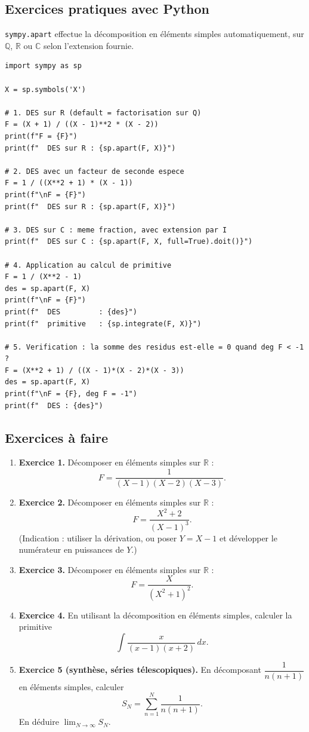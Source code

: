 \subsection{Exercices pratiques avec Python}
\texttt{sympy.apart} effectue la décomposition en éléments simples automatiquement, sur $\mathbb{Q}$, $\mathbb{R}$ ou $\mathbb{C}$ selon l'extension fournie.

\begin{lstlisting}
import sympy as sp

X = sp.symbols('X')

# 1. DES sur R (default = factorisation sur Q)
F = (X + 1) / ((X - 1)**2 * (X - 2))
print(f"F = {F}")
print(f"  DES sur R : {sp.apart(F, X)}")

# 2. DES avec un facteur de seconde espece
F = 1 / ((X**2 + 1) * (X - 1))
print(f"\nF = {F}")
print(f"  DES sur R : {sp.apart(F, X)}")

# 3. DES sur C : meme fraction, avec extension par I
print(f"  DES sur C : {sp.apart(F, X, full=True).doit()}")

# 4. Application au calcul de primitive
F = 1 / (X**2 - 1)
des = sp.apart(F, X)
print(f"\nF = {F}")
print(f"  DES         : {des}")
print(f"  primitive   : {sp.integrate(F, X)}")

# 5. Verification : la somme des residus est-elle = 0 quand deg F < -1 ?
F = (X**2 + 1) / ((X - 1)*(X - 2)*(X - 3))
des = sp.apart(F, X)
print(f"\nF = {F}, deg F = -1")
print(f"  DES : {des}")
\end{lstlisting}

\subsection{Exercices à faire}
\begin{enumerate}
    \item \textbf{Exercice 1.} Décomposer en éléments simples sur $\mathbb{R}$ :
    \[ F = \frac{1}{(X - 1)(X - 2)(X - 3)}. \]
    \item \textbf{Exercice 2.} Décomposer en éléments simples sur $\mathbb{R}$ :
    \[ F = \frac{X^2 + 2}{(X - 1)^3}. \]
    (Indication : utiliser la dérivation, ou poser $Y = X - 1$ et développer le numérateur en puissances de $Y$.)
    \item \textbf{Exercice 3.} Décomposer en éléments simples sur $\mathbb{R}$ :
    \[ F = \frac{X}{(X^2 + 1)^2}. \]
    \item \textbf{Exercice 4.} En utilisant la décomposition en éléments simples, calculer la primitive
    \[ \int \frac{x}{(x - 1)(x + 2)}\, dx. \]
    \item \textbf{Exercice 5 (synthèse, séries télescopiques).} En décomposant $\dfrac{1}{n(n + 1)}$ en éléments simples, calculer
    \[ S_N = \sum_{n=1}^{N} \frac{1}{n(n + 1)}. \]
    En déduire $\lim_{N \to \infty} S_N$.
\end{enumerate}

